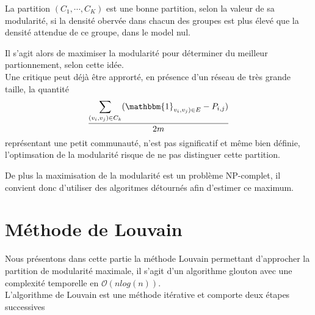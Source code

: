 \documentclass[frenchb]{report}
\newcommand{\1}{\mathbbm{1}}
\theoremstyle{definition}\newtheorem{defn}{Définition}
\theoremstyle{definition}\newtheorem{exm}{Exemple}
\theoremstyle{definition}\newtheorem{nota}{Notation}
\theoremstyle{definition}\newtheorem{rem}{Remarque}
\begin{document}
La partition $(C_1,\cdots,C_K)$ est une bonne partition, selon la valeur de sa modularité, si la densité obervée dans chacun des groupes est plus élevé que la densité attendue de ce groupe, dans le model nul.

Il s'agit alors de maximiser la modularité pour déterminer du meilleur partionnement, selon cette idée.\\



Une critique peut déjà être approrté, en présence d'un réseau de très grande taille, la quantité
\[
	\frac{\displaystyle\sum_{(v_i,v_j)\in C_k} (\1_{v_i,v_j) \in E} - P_{i,j})}{2m}
\]
 représentant une petit communauté, n'est pas significatif et même bien définie, l'optimsation de la modularité risque de ne pas distinguer cette partition. \newline

De plus la maximisation de la modularité est un problème NP-complet, il convient donc d'utiliser des algoritmes détournés afin d'estimer ce maximum.\\



\section*{Méthode de Louvain}




Nous présentons dans cette partie la méthode Louvain permettant d'approcher la partition de modularité maximale, il s'agit d'un algorithme glouton avec une complexité temporelle en $\mathcal{O}(nlog(n))$.\\

L'algorithme de Louvain est une méthode itérative et comporte deux étapes successives\newline
\end{document}
